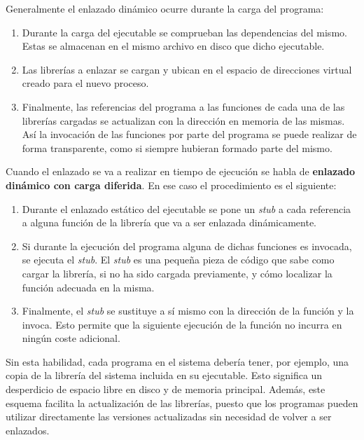 Generalmente el enlazado dinámico ocurre durante la carga del programa:

\begin{enumerate}
\def\labelenumi{\arabic{enumi}.}
\item
  Durante la carga del ejecutable se comprueban las dependencias del
  mismo. Estas se almacenan en el mismo archivo en disco que dicho
  ejecutable.
\item
  Las librerías a enlazar se cargan y ubican en el espacio de
  direcciones virtual creado para el nuevo proceso.
\item
  Finalmente, las referencias del programa a las funciones de cada una
  de las librerías cargadas se actualizan con la dirección en memoria de
  las mismas. Así la invocación de las funciones por parte del programa
  se puede realizar de forma transparente, como si siempre hubieran
  formado parte del mismo.
\end{enumerate}

Cuando el enlazado se va a realizar en tiempo de ejecución se habla de
\textbf{enlazado dinámico con carga diferida}{}. En ese caso el
procedimiento es el siguiente:

\begin{enumerate}
\def\labelenumi{\arabic{enumi}.}
\item
  Durante el enlazado estático del ejecutable se pone un \emph{stub} a
  cada referencia a alguna función de la librería que va a ser enlazada
  dinámicamente.
\item
  Si durante la ejecución del programa alguna de dichas funciones es
  invocada, se ejecuta el \emph{stub}. El \emph{stub} es una pequeña
  pieza de código que sabe como cargar la librería, si no ha sido
  cargada previamente, y cómo localizar la función adecuada en la misma.
\item
  Finalmente, el \emph{stub} se sustituye a sí mismo con la dirección de
  la función y la invoca. Esto permite que la siguiente ejecución de la
  función no incurra en ningún coste adicional.
\end{enumerate}

Sin esta habilidad, cada programa en el sistema debería tener, por
ejemplo, una copia de la librería del sistema incluida en su ejecutable.
Esto significa un desperdicio de espacio libre en disco y de memoria
principal. Además, este esquema facilita la actualización de las
librerías, puesto que los programas pueden utilizar directamente las
versiones actualizadas sin necesidad de volver a ser enlazados.


